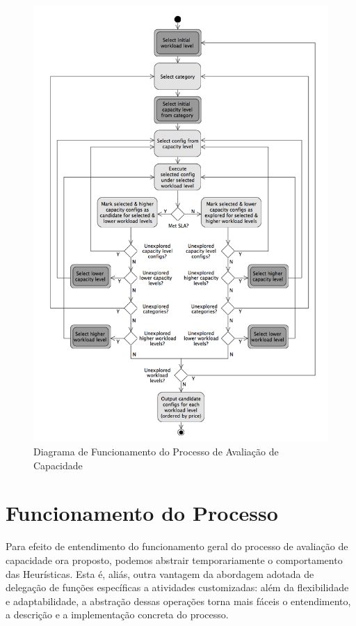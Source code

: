 \begin{figure}
  \caption{\label{fig:fig_processo_aval_capacidade}Diagrama de Funcionamento do Processo de Avaliação de Capacidade}
  \begin{center}
    \includegraphics[scale=0.45]{img/capacity-planning-diagram-v13-mono}
  \end{center}
\end{figure}

\section{Funcionamento do Processo}
\label{sec:funcionamento_processo}
Para efeito de entendimento do funcionamento geral do processo de avaliação de 
capacidade ora proposto, podemos abstrair temporariamente o comportamento das 
Heurísticas. Esta é, aliás, outra vantagem da abordagem adotada de 
delegação de funções específicas a atividades customizadas: além da flexibilidade e 
adaptabilidade, a abstração dessas operações torna mais fáceis o entendimento, 
a descrição e a implementação concreta do processo.

